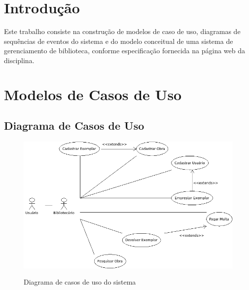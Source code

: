 \documentclass[
	12pt,				%
	openright,			%
	oneside,			%
	a4paper,			%
	english,			%
	brazil				%
	]{abntex2}
\begin{document}
\frenchspacing 


\imprimircapa

\imprimirfolhaderosto*

\tableofcontents*
\cleardoublepage



\textual

\chapter*[Introdução]{Introdução}

	Este trabalho consiste na construção de modelos de caso de uso, diagramas de sequências de eventos do sistema e do modelo conceitual 
de uma sistema de gerenciamento de biblioteca, conforme especificação fornecida na página web da disciplina.

\chapter{Modelos de Casos de Uso}

\section{Diagrama de Casos de Uso}

\begin{figure}[H]
\includegraphics[width=1\textwidth]{useCase}
\label{fig:figura1}
\caption{\small Diagrama de casos de uso do sistema}
\end{figure}
\end{document}
